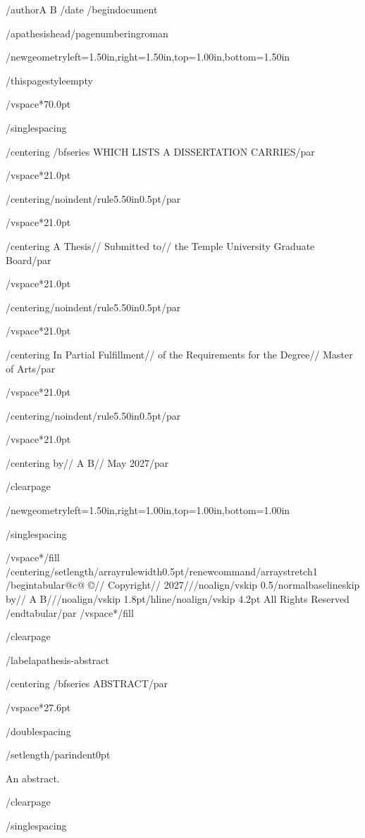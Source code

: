 /author{A B}
/date{}
/begin{document}


/apathesishead/pagenumbering{roman}

/newgeometry{left=1.50in,right=1.50in,top=1.00in,bottom=1.50in}

/thispagestyle{empty}

/vspace*{70.0pt}

/singlespacing

{/centering
/bfseries WHICH LISTS A DISSERTATION CARRIES/par}

/vspace*{21.0pt}

{/centering/noindent/rule{5.50in}{0.5pt}/par}

/vspace*{21.0pt}

{/centering
A Thesis//
Submitted to//
the Temple University Graduate Board/par}

/vspace*{21.0pt}

{/centering/noindent/rule{5.50in}{0.5pt}/par}

/vspace*{21.0pt}

{/centering
In Partial Fulfillment//
of the Requirements for the Degree//
Master of Arts/par}

/vspace*{21.0pt}

{/centering/noindent/rule{5.50in}{0.5pt}/par}

/vspace*{21.0pt}

{/centering
by//
A B//
May 2027/par}

/clearpage

/newgeometry{left=1.50in,right=1.00in,top=1.00in,bottom=1.00in}

/singlespacing

/vspace*{/fill}
{/centering/setlength{/arrayrulewidth}{0.5pt}/renewcommand{/arraystretch}{1}
/begin{tabular}{@{}c@{}}
©//
Copyright//
2027///noalign{/vskip 0.5/normalbaselineskip}
by//
A B///noalign{/vskip 1.8pt}/hline/noalign{/vskip 4.2pt}
All Rights Reserved
/end{tabular}/par}
/vspace*{/fill}

/clearpage

/label{apathesis-abstract}

{/centering
/bfseries ABSTRACT/par}

/vspace*{27.6pt}

/doublespacing

{/setlength{/parindent}{0pt}

An abstract.

}

/clearpage

/singlespacing

